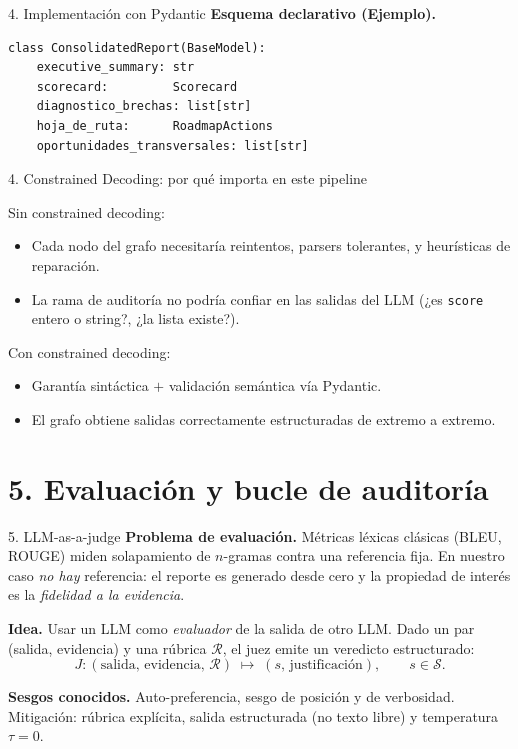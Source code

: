 \documentclass[10pt,aspectratio=169]{beamer}
\begin{document}
\begin{frame}[fragile]{4. Implementación con Pydantic}
	\textbf{Esquema declarativo (Ejemplo).}
	\begin{lstlisting}[style=py]
class ConsolidatedReport(BaseModel):
    executive_summary: str
    scorecard:         Scorecard
    diagnostico_brechas: list[str]
    hoja_de_ruta:      RoadmapActions
    oportunidades_transversales: list[str]
\end{lstlisting}
\end{frame}

\begin{frame}{4. Constrained Decoding: por qué importa en este pipeline}

	Sin constrained decoding:
	\begin{itemize}
		\item Cada nodo del grafo necesitaría reintentos, parsers tolerantes,
		      y heurísticas de reparación.
		\item La rama de auditoría no podría confiar en las salidas del LLM (¿es \texttt{score} entero o string?, ¿la lista existe?).
	\end{itemize}

	Con constrained decoding:
	\begin{itemize}
		\item Garantía sintáctica $+$ validación semántica vía Pydantic.
		\item El grafo obtiene salidas correctamente estructuradas de extremo a extremo.
	\end{itemize}
\end{frame}

\section*{5. Evaluación y bucle de auditoría}

\begin{frame}{5. LLM-as-a-judge}
	\textbf{Problema de evaluación.} Métricas léxicas clásicas
	(BLEU, ROUGE) miden solapamiento de $n$-gramas contra una referencia
	fija. En nuestro caso \emph{no hay} referencia: el reporte es
	generado desde cero y la propiedad de interés es la
	\emph{fidelidad a la evidencia}.

	\medskip
	\textbf{Idea.} Usar un LLM como \emph{evaluador} de la salida de
	otro LLM. Dado un par (salida, evidencia) y una rúbrica
	$\mathcal{R}$, el juez emite un veredicto estructurado:
	\[
		J : (\text{salida},\, \text{evidencia},\, \mathcal{R})
		\;\longmapsto\;
		(s,\, \text{justificación}),
		\qquad s \in \mathcal{S}.
	\]

	\medskip
	\textbf{Sesgos conocidos.} Auto-preferencia, sesgo de posición y
	de verbosidad. Mitigación: rúbrica explícita, salida estructurada
	(no texto libre) y temperatura $\tau=0$.
\end{frame}
\end{document}
